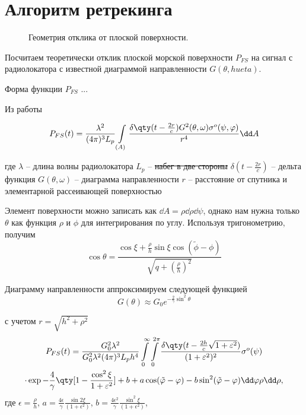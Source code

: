 \section{Алгоритм ретрекинга}
\begin{figure}[h]
    \centering
    \caption{Геометрия отклика от плоской поверхности.}
    \label{fig:geometry}
\end{figure}
Посчитаем теоретически отклик плоской морской поверхности $P_{FS}$ на сигнал с
радиолокатора с известной диаграммой направленности $G(\theta,hueta)$.


Форма функции $P_{FS}$ ... 

Из работы \cite{moore-and-williams} 

\begin{equation}
    P_{FS}(t) = \frac{\lambda^2}{(4 \pi)^3 L_p} \int\limits_{(A)} 
    \frac
        {\delta\qty(t - \frac{2r}{c}) G^2(\theta,\omega) \sigma^o(\psi,\phi)}
        {r^4} 
    \dd A
\end{equation}

где
$\lambda$ -- длина волны радиолокатора
$L_p$ -- \sout{набег в две стороны} 
$\delta(t - \frac{2r}{c})$ -- дельта функция
$G(\theta, \omega)$ -- диаграмма направленности
 $r$ -- расстояние от спутника и элементарной рассеивающей поверхностью

 Элемент поверхности можно записать как $\dd A = \rho \dd \rho \dd \psi$,
 однако нам нужна  только $\theta$ как функция $\rho$ и $\phi$ для
 интегрирования по углу. Используя тригонометрию, получим
 \begin{equation}
     \label{eq:}
     \cos \theta = 
     \frac{\cos \xi + \frac{\rho}{h} \sin \xi \cos(\tilde \phi - \phi)}{\sqrt{q
     + (\frac{\rho}{h})^2}}
 \end{equation}


 Диаграмму направленности аппроксимируем следующей функцией
 \begin{equation}
     \label{eq:}
     G(\theta) \approx G_0 e^{-\frac{2}{\gamma} \sin^2 \theta}
 \end{equation}

 с учетом $r = \sqrt{h^{2} + \rho^{2}}$ 
 \begin{multline}
     P_{FS}(t) = \frac{G_0^2\lambda^2}{G_0^2 \lambda^2 (4 \pi)^3 L_p h^4}
     \int\limits_{0}^{\infty} \int\limits_{0}^{2 \pi}   
     \frac{\delta\qty(t - \frac{2h}{c}\sqrt{1+ \epsilon^2})}{(1+\epsilon^2)^2} \sigma^o(\psi)
     \\
     \cdot \exp{-\frac{4}{\gamma} \qty[1 - \frac{\cos^2 \xi}{1+ \epsilon^2}] + b
     + a\cos(\tilde \phi - \phi) - b \sin^2(\tilde \phi - \phi)} \dd \phi \rho
     \dd \rho,
 \end{multline}
 где 
 $\epsilon = \frac{\rho}{h}$,
 $a = \frac{4\epsilon}{\gamma} \frac{\sin 2 \xi}{(1+ \epsilon^2)}$,
 $b= \frac{4\epsilon^2}{\gamma} \frac{\sin^2 \xi}{(1+\epsilon^2)}$,

